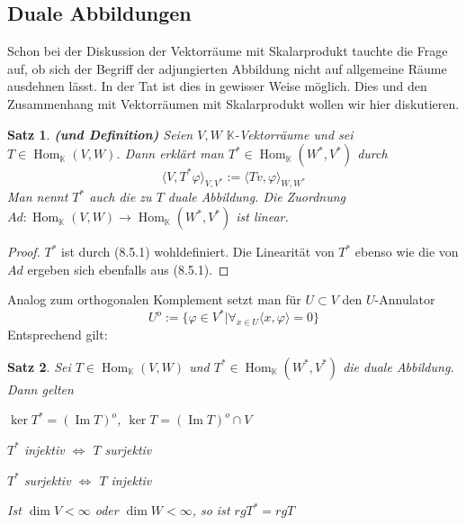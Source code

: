 \documentclass[12pt,a4paper]{article}
\newtheorem{theorem}{Satz}
\theoremstyle{definition}
\theoremstyle{remark}
\DeclareMathOperator{\Hom}{Hom}
\DeclareMathOperator{\Img}{Im}
\begin{document}
	\subsection{Duale Abbildungen}
	Schon bei der Diskussion der Vektorräume mit Skalarprodukt tauchte die Frage auf, ob sich der Begriff der adjungierten Abbildung nicht auf allgemeine Räume ausdehnen lässt. In der Tat ist dies in gewisser Weise möglich. Dies und den Zusammenhang mit Vektorräumen mit Skalarprodukt wollen wir hier diskutieren. \\
	\begin{theorem}{\textbf{(und Definition)}}
		Seien $V,W$ $\mathbb{K}$-Vektorräume und sei $T \in \Hom_{\mathbb{K}}(V,W)$. Dann erklärt man $T^* \in \Hom_{\mathbb{K}}(W^*,V^*)$ durch
		\begin{equation}
			\langle V, T^* \varphi \rangle_{V, V^*} := \langle Tv, \varphi \rangle_{W, W^*}
		\end{equation}
		Man nennt $T^*$ auch die zu $T$ duale Abbildung. Die Zuordnung $Ad: \Hom_{\mathbb{K}}(V,W) \rightarrow \Hom_{\mathbb{K}}(W^*,V^*)$ ist linear.
	\end{theorem}
	\begin{proof}
		$T^*$ ist durch (8.5.1) wohldefiniert. Die Linearität von $T^*$ ebenso wie die von $Ad$ ergeben sich ebenfalls aus (8.5.1).
	\end{proof}
	Analog zum orthogonalen Komplement setzt man für $U \subset V$ den $U$-Annulator
	\begin{equation}
		U^o := \{ \varphi \in V^* | \forall_{x \in U} \langle x, \varphi \rangle = 0 \}
	\end{equation}
	Entsprechend gilt:
	\begin{theorem}
		Sei $T \in \Hom_{\mathbb{K}}(V, W)$ und $T^* \in \Hom_{\mathbb{K}}(W^*,V^*)$ die duale Abbildung. Dann gelten
		\begin{proofenum}
			\item 	
				$\ker T^* = (\Img T)^o$, $\ker T = (\Img T)^o \cap V$
			\item 
				$T^*$ injektiv $\Leftrightarrow$ $T$ surjektiv
			\item 
				$T^*$ surjektiv $\Leftrightarrow$ $T$ injektiv
			\item 
				Ist $\dim V < \infty$ oder $\dim W < \infty$, so ist $rg T^* = rg T$
		\end{proofenum}
	\end{theorem}
\end{document}
